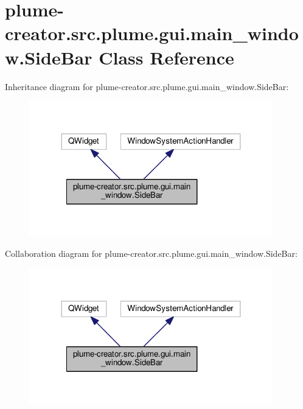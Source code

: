 \hypertarget{classplume-creator_1_1src_1_1plume_1_1gui_1_1main__window_1_1_side_bar}{}\section{plume-\/creator.src.\+plume.\+gui.\+main\+\_\+window.\+Side\+Bar Class Reference}
\label{classplume-creator_1_1src_1_1plume_1_1gui_1_1main__window_1_1_side_bar}


Inheritance diagram for plume-\/creator.src.\+plume.\+gui.\+main\+\_\+window.\+Side\+Bar\+:\nopagebreak
\begin{figure}[H]
\begin{center}
\leavevmode
\includegraphics[width=300pt]{classplume-creator_1_1src_1_1plume_1_1gui_1_1main__window_1_1_side_bar__inherit__graph}
\end{center}
\end{figure}


Collaboration diagram for plume-\/creator.src.\+plume.\+gui.\+main\+\_\+window.\+Side\+Bar\+:\nopagebreak
\begin{figure}[H]
\begin{center}
\leavevmode
\includegraphics[width=300pt]{classplume-creator_1_1src_1_1plume_1_1gui_1_1main__window_1_1_side_bar__coll__graph}
\end{center}
\end{figure}
